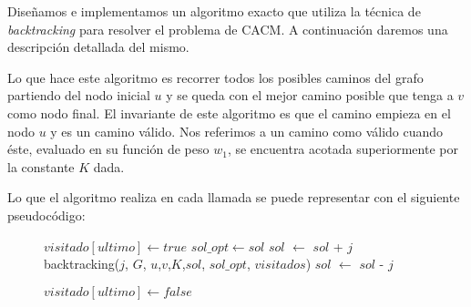 Diseñamos e implementamos un algoritmo exacto que utiliza la técnica de \emph{backtracking} para resolver el problema de CACM. A continuación daremos una descripción detallada del mismo.

Lo que hace este algoritmo es recorrer todos los posibles caminos del grafo partiendo del nodo inicial $u$ y se queda con el mejor camino posible que tenga a $v$ como nodo final. El invariante de este algoritmo es que el camino empieza en el nodo $u$ y es un camino válido. Nos referimos a un camino como válido cuando éste, evaluado en su función de peso $w_1$, se encuentra acotada superiormente por la constante $K$ dada.

Lo que el algoritmo realiza en cada llamada se puede representar con el siguiente pseudocódigo:

\begin{center}
 \begin{figure}[H]
  \begin{pseudo}
    \State $visitado[ultimo] \leftarrow true$
	  \State $sol\_opt \leftarrow sol$
	\EndIf
      \Else 
	  \State $sol$ $\leftarrow$ $sol$ + $j$
	  \State backtracking($j$, $G$, $u$,$v$,$K$,$sol$, $sol\_opt$, $visitados$)
	  \State $sol$ $\leftarrow$ $sol$ - $j$
	\EndIf 
	
	\EndFor
      \EndIf
      \State $visitado[ultimo] \leftarrow false$
   \EndProcedure
  \end{pseudo}
 \end{figure}
\end{center}